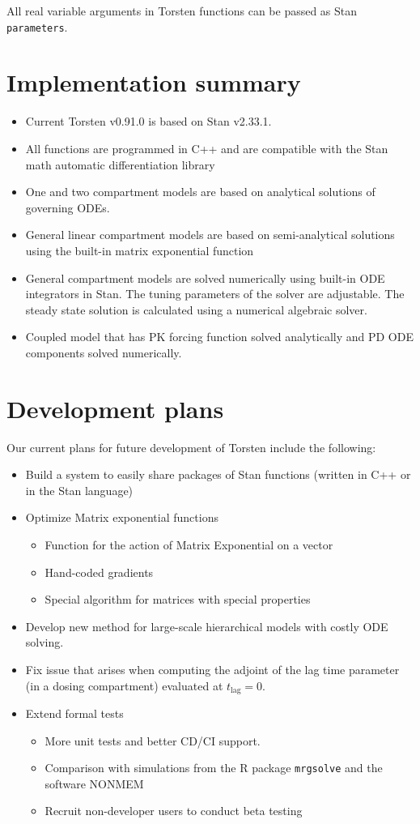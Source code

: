 \documentclass[12pt, reqno, oneside]{amsbook}
\numberwithin{equation}{chapter}
\numberwithin{figure}{chapter}
\numberwithin{table}{chapter}
\theoremstyle{remark}
\begin{document}
All real variable arguments in Torsten functions can be passed as Stan \texttt{parameters}.

\section{Implementation summary}
\label{sec:orgabe7e42}
\begin{itemize}
\item Current Torsten v0.91.0 is based on Stan v2.33.1.
\item All functions are programmed in C++ and are compatible
with the Stan math automatic differentiation library \cite{carpenter15_stan_math_librar}
\item One and two compartment models are based on analytical solutions of governing ODEs.
\item General linear compartment models are based on semi-analytical solutions using the built-in matrix exponential function
\item General compartment models are solved numerically using built-in ODE integrators in Stan. The tuning parameters of the solver are adjustable. The steady state solution is calculated using a numerical algebraic solver.
\item Coupled model that has PK forcing function solved analytically and PD ODE components solved numerically.
\end{itemize}

\section{Development plans}
\label{sec:org8ee92bb}
Our current plans for future development of Torsten include the
following:
\begin{itemize}
\item Build a system to easily share packages of Stan functions
(written in C++ or in the Stan language)
\item Optimize Matrix exponential functions
\begin{itemize}
\item Function for the action of Matrix Exponential on a vector
\item Hand-coded gradients
\item Special algorithm for matrices with special properties
\end{itemize}
\item Develop new method for large-scale hierarchical models with costly
ODE solving.
\item Fix issue that arises when computing the adjoint of the lag time
parameter (in a dosing compartment) evaluated at \(t_{\text{lag}} = 0\).
\item Extend formal tests
\begin{itemize}
\item More unit tests and better CD/CI support.
\item Comparison with simulations from the R package
\texttt{mrgsolve} and the software NONMEM\textregistered{}
\item Recruit non-developer users to conduct beta testing
\end{itemize}
\end{itemize}
\end{document}
